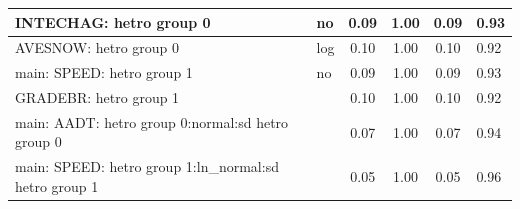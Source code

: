 \begin{table}
\begin{center}
\begin{tabular}{|l|l|c|c|c|l|}
			\hline
			INTECHAG: hetro group 0 & no & 0.09 & 1.00 & 0.09 & 0.93 \\
			\hline
			AVESNOW: hetro group 0 & log & 0.10 & 1.00 & 0.10 & 0.92 \\
			\hline
			main: SPEED: hetro group 1 & no & 0.09 & 1.00 & 0.09 & 0.93 \\
			\hline
			GRADEBR: hetro group 1 &  & 0.10 & 1.00 & 0.10 & 0.92 \\
			\hline
			main: AADT: hetro group 0:normal:sd  hetro group 0 &  & 0.07 & 1.00 & 0.07 & 0.94 \\
			\hline
			main: SPEED: hetro group 1:ln_normal:sd  hetro group 1 &  & 0.05 & 1.00 & 0.05 & 0.96 \\
			\hline
		\end{tabular}
	\end{center}
\end{table}